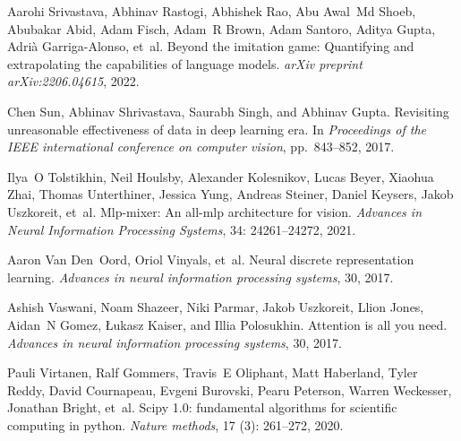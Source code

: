 \documentclass{article} %
\begin{document}
\begin{thebibliography}{67}
Aarohi Srivastava, Abhinav Rastogi, Abhishek Rao, Abu Awal~Md Shoeb, Abubakar
  Abid, Adam Fisch, Adam~R Brown, Adam Santoro, Aditya Gupta, Adri{\`a}
  Garriga-Alonso, et~al.
\newblock Beyond the imitation game: Quantifying and extrapolating the
  capabilities of language models.
\newblock \emph{arXiv preprint arXiv:2206.04615}, 2022.

Chen Sun, Abhinav Shrivastava, Saurabh Singh, and Abhinav Gupta.
\newblock Revisiting unreasonable effectiveness of data in deep learning era.
\newblock In \emph{Proceedings of the IEEE international conference on computer
  vision}, pp.\  843--852, 2017.

Ilya~O Tolstikhin, Neil Houlsby, Alexander Kolesnikov, Lucas Beyer, Xiaohua
  Zhai, Thomas Unterthiner, Jessica Yung, Andreas Steiner, Daniel Keysers,
  Jakob Uszkoreit, et~al.
\newblock Mlp-mixer: An all-mlp architecture for vision.
\newblock \emph{Advances in Neural Information Processing Systems},
  34: 24261--24272, 2021.

Aaron Van Den~Oord, Oriol Vinyals, et~al.
\newblock Neural discrete representation learning.
\newblock \emph{Advances in neural information processing systems}, 30, 2017.

Ashish Vaswani, Noam Shazeer, Niki Parmar, Jakob Uszkoreit, Llion Jones,
  Aidan~N Gomez, {\L}ukasz Kaiser, and Illia Polosukhin.
\newblock Attention is all you need.
\newblock \emph{Advances in neural information processing systems}, 30, 2017.

Pauli Virtanen, Ralf Gommers, Travis~E Oliphant, Matt Haberland, Tyler Reddy,
  David Cournapeau, Evgeni Burovski, Pearu Peterson, Warren Weckesser, Jonathan
  Bright, et~al.
\newblock Scipy 1.0: fundamental algorithms for scientific computing in python.
\newblock \emph{Nature methods}, 17 (3): 261--272, 2020.


\end{thebibliography}
\end{document}
